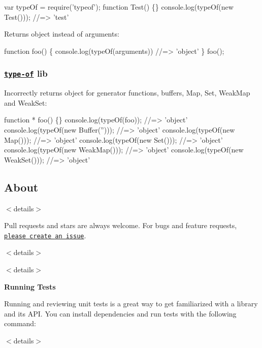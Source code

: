 \begin{DoxyCode}
var typeOf = require('typeof');
function Test() \{\}
console.log(typeOf(new Test()));
//=> 'test'
\end{DoxyCode}


Returns {\ttfamily object} instead of {\ttfamily arguments}\+:


\begin{DoxyCode}
function foo() \{
  console.log(typeOf(arguments)) //=> 'object'
\}
foo();
\end{DoxyCode}


\subsubsection*{\href{https://github.com/ForbesLindesay/type-of}{\tt type-\/of} lib}

Incorrectly returns {\ttfamily object} for generator functions, buffers, {\ttfamily Map}, {\ttfamily Set}, {\ttfamily Weak\+Map} and {\ttfamily Weak\+Set}\+:


\begin{DoxyCode}
function * foo() \{\}
console.log(typeOf(foo));
//=> 'object'
console.log(typeOf(new Buffer('')));
//=> 'object'
console.log(typeOf(new Map()));
//=> 'object'
console.log(typeOf(new Set()));
//=> 'object'
console.log(typeOf(new WeakMap()));
//=> 'object'
console.log(typeOf(new WeakSet()));
//=> 'object'
\end{DoxyCode}


\subsection*{About}

$<$details$>$

Pull requests and stars are always welcome. For bugs and feature requests, \href{../../issues/new}{\tt please create an issue}.

$<$details$>$

$<$details$>$ 

{\bfseries Running Tests}

Running and reviewing unit tests is a great way to get familiarized with a library and its A\+PI. You can install dependencies and run tests with the following command\+:




$<$details$>$

